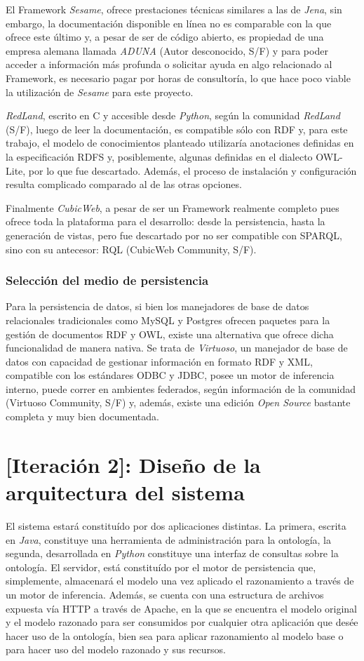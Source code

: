 El Framework \textit{Sesame}, ofrece prestaciones técnicas similares a las de \textit{Jena}, sin embargo, la documentación disponible en línea no es comparable con la que ofrece este último y, a pesar de ser de código abierto, es propiedad de una empresa alemana llamada \textit{ADUNA} (Autor desconocido, S/F) y para poder acceder a información más profunda o solicitar ayuda en algo relacionado al Framework, es necesario pagar por horas de consultoría, lo que hace poco viable la utilización de \textit{Sesame} para este proyecto.

\textit{RedLand}, escrito en C y accesible desde \textit{Python}, según la comunidad \textit{RedLand} (S/F), luego de leer la documentación, es compatible sólo con RDF y, para este trabajo, el modelo de conocimientos planteado utilizaría anotaciones definidas en la especificación RDFS y, posiblemente, algunas definidas en el dialecto OWL-Lite, por lo que fue descartado. Además, el proceso de instalación y configuración resulta complicado comparado al de las otras opciones.

Finalmente \textit{CubicWeb}, a pesar de ser un Framework realmente completo pues ofrece toda la plataforma para el desarrollo: desde la persistencia, hasta la generación de vistas, pero fue descartado por no ser compatible con SPARQL, sino con su antecesor: RQL (CubicWeb Community, S/F).

\subsubsection{Selección del medio de persistencia}
Para la persistencia de datos, si bien los manejadores de base de datos relacionales tradicionales como MySQL y Postgres ofrecen paquetes para la gestión de documentos RDF y OWL, existe una alternativa que ofrece dicha funcionalidad de manera nativa. Se trata de \textit{Virtuoso}, un manejador de base de datos con capacidad de gestionar información en formato RDF y XML, compatible con los estándares ODBC y JDBC, posee un motor de inferencia interno, puede correr en ambientes federados, según información de la comunidad (Virtuoso Community, S/F) y, además, existe una edición \textit{Open Source} bastante completa y muy bien documentada.

\section{[Iteración 2]: Diseño de la arquitectura del sistema}
El sistema estará constituído por dos aplicaciones distintas. La primera, escrita en \textit{Java}, constituye una herramienta de administración para la ontología, la segunda, desarrollada en \textit{Python} constituye una interfaz de consultas sobre la ontología. El servidor, está constituído por el motor de persistencia que, simplemente, almacenará el modelo una vez aplicado el razonamiento a través de un motor de inferencia. Además, se cuenta con una estructura de archivos expuesta vía HTTP a través de Apache, en la que se encuentra el modelo original y el modelo razonado para ser consumidos por cualquier otra aplicación que desée hacer uso de la ontología, bien sea para aplicar razonamiento al modelo base o para hacer uso del modelo razonado y sus recursos.

